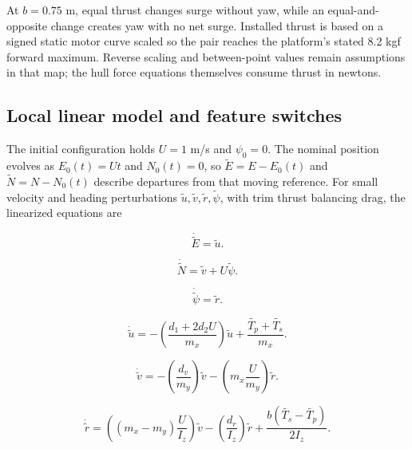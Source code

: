 \documentclass[10pt,letterpaper]{article}
\begin{document}
At \(b = 0.75\) m, equal thrust changes surge without yaw, while an equal-and-opposite change creates yaw with no net surge. Installed thrust is based on a signed static motor curve scaled so the pair reaches the platform's stated 8.2 kgf forward maximum. Reverse scaling and between-point values remain assumptions in that map; the hull force equations themselves consume thrust in newtons.

\subsection{Local linear model and feature switches}

The initial configuration holds \(U = 1\) m/s and \(\psi_{0} = 0\). The nominal position evolves as \(E_{0}(t) = Ut\) and \(N_{0}(t) = 0\), so \(\widetilde{E} = E - E_{0}(t)\) and \(\widetilde{N} = N - N_{0}(t)\) describe departures from that moving reference. For small velocity and heading perturbations \(\widetilde{u},\widetilde{v},\widetilde{r},\widetilde{\psi}\), with trim thrust balancing drag, the linearized equations are

\begin{equation}
\dot{\widetilde{E}} = \widetilde{u}.
\end{equation}

\begin{equation}
\dot{\widetilde{N}} = \widetilde{v} + U\widetilde{\psi}.
\end{equation}

\begin{equation}
\dot{\widetilde{\psi}} = \widetilde{r}.
\end{equation}

\begin{equation}
\dot{\widetilde{u}} = - \left( \frac{d_{1} + 2d_{2}U}{m_{x}} \right)\widetilde{u} + \frac{\widetilde{T_{p}} + \widetilde{T_{s}}}{m_{x}}.
\end{equation}

\begin{equation}
\dot{\widetilde{v}} = - \left( \frac{d_{v}}{m_{y}} \right)\widetilde{v} - \left( m_{x}\frac{U}{m_{y}} \right)\widetilde{r}.
\end{equation}

\begin{equation}
\dot{\widetilde{r}} = \left( \left( m_{x} - m_{y} \right)\frac{U}{I_{z}} \right)\widetilde{v} - \left( \frac{d_{r}}{I_{z}} \right)\widetilde{r} + \frac{b\left( \widetilde{T_{s}} - \widetilde{T_{p}} \right)}{2I_{z}}.
\end{equation}
\end{document}
